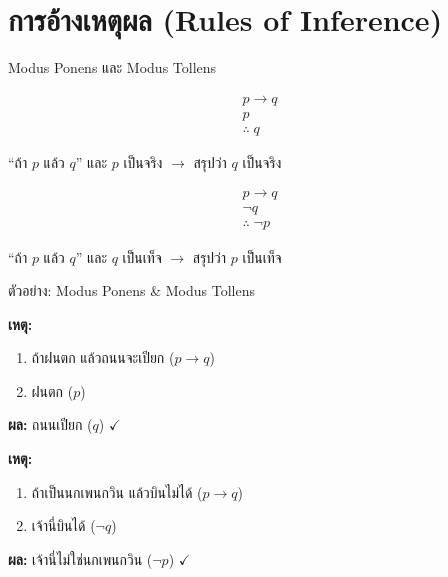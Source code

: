 \documentclass[11pt, aspectratio=169]{beamer}
\begin{document}
\section{การอ้างเหตุผล (Rules of Inference)}

\begin{frame}{Modus Ponens และ Modus Tollens}
  \begin{explanation}
    \[
      \begin{array}{c}
        p \to q \\
        p \\
        \hline
        \therefore\; q
      \end{array}
    \]

    ``ถ้า $p$ แล้ว $q$'' และ $p$ เป็นจริง $\rightarrow$ สรุปว่า $q$ เป็นจริง
  \end{explanation}

  \begin{explanation}
    \[
      \begin{array}{c}
        p \to q \\
        \lnot q \\
        \hline
        \therefore\; \lnot p
      \end{array}
    \]

    ``ถ้า $p$ แล้ว $q$'' และ $q$ เป็นเท็จ $\rightarrow$ สรุปว่า $p$ เป็นเท็จ
  \end{explanation}
\end{frame}

\begin{frame}{ตัวอย่าง: Modus Ponens \& Modus Tollens}
  \begin{exambox}
    \textbf{เหตุ:}
    \begin{enumerate}
      \item ถ้าฝนตก แล้วถนนจะเปียก \quad ($p \to q$)
      \item ฝนตก \quad ($p$)
    \end{enumerate}
    \textbf{ผล:} ถนนเปียก \quad ($q$) \quad $\checkmark$
  \end{exambox}

  \begin{exambox}
    \textbf{เหตุ:}
    \begin{enumerate}
      \item ถ้าเป็นนกเพนกวิน แล้วบินไม่ได้ \quad ($p \to q$)
      \item เจ้านี่บินได้ \quad ($\lnot q$)
    \end{enumerate}
    \textbf{ผล:} เจ้านี่ไม่ใช่นกเพนกวิน \quad ($\lnot p$) \quad $\checkmark$
  \end{exambox}
\end{frame}
\end{document}
